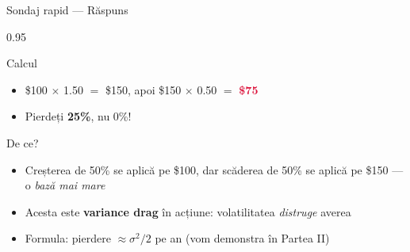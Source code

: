 \documentclass[9pt, aspectratio=169, t]{beamer}
\begin{document}
\begin{frame}{Sondaj rapid --- Răspuns}
    \begin{cminipage}{0.95\textwidth}
    \begin{exampleblock}{Calcul}
    \begin{itemize}\setlength{\itemsep}{0pt}
        \item \$100 $\times$ 1.50 $=$ \$150, apoi \$150 $\times$ 0.50 $=$ \textcolor{Crimson}{\textbf{\$75}}
        \item Pierdeți \textbf{25\%}, nu 0\%!
    \end{itemize}
    \end{exampleblock}
    \vspace{0.3cm}
    \begin{alertblock}{De ce?}
    \begin{itemize}\setlength{\itemsep}{0pt}
        \item Creșterea de 50\% se aplică pe \$100, dar scăderea de 50\% se aplică pe \$150 --- o \textit{bază mai mare}
        \item Acesta este \textbf{variance drag} în acțiune: volatilitatea \textit{distruge} averea
        \item Formula: pierdere $\approx \sigma^2 / 2$ pe an (vom demonstra în Partea II)
    \end{itemize}
    \end{alertblock}
    \end{cminipage}
\end{frame}
\end{document}
